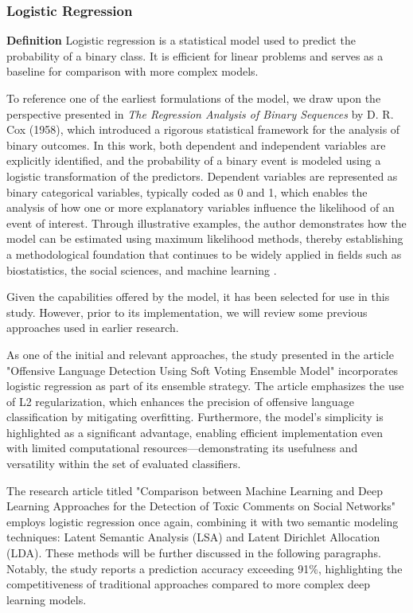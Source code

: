 \subsubsection{Logistic Regression}
\textbf{Definition}
Logistic regression is a statistical model used to predict the probability of a binary class. It is efficient for linear problems and serves as a baseline for comparison with more complex models.

To reference one of the earliest formulations of the model, we draw upon the perspective presented in \textit{The Regression Analysis of Binary Sequences} by D. R. Cox (1958), which introduced a rigorous statistical framework for the analysis of binary outcomes. In this work, both dependent and independent variables are explicitly identified, and the probability of a binary event is modeled using a logistic transformation of the predictors. Dependent variables are represented as binary categorical variables, typically coded as 0 and 1, which enables the analysis of how one or more explanatory variables influence the likelihood of an event of interest. Through illustrative examples, the author demonstrates how the model can be estimated using maximum likelihood methods, thereby establishing a methodological foundation that continues to be widely applied in fields such as biostatistics, the social sciences, and machine learning \citep{cox1958logistic}.

Given the capabilities offered by the model, it has been selected for use in this study. However, prior to its implementation, we will review some previous approaches used in earlier research.

As one of the initial and relevant approaches, the study presented in the article "Offensive Language Detection Using Soft Voting Ensemble Model" \citep{supert2023offensive} incorporates logistic regression as part of its ensemble strategy. The article emphasizes the use of L2 regularization, which enhances the precision of offensive language classification by mitigating overfitting. Furthermore, the model's simplicity is highlighted as a significant advantage, enabling efficient implementation even with limited computational resources—demonstrating its usefulness and versatility within the set of evaluated classifiers.

The research article titled "Comparison between Machine Learning and Deep Learning Approaches for the Detection of Toxic Comments on Social Networks" \citep{bonetti2023comparison} employs logistic regression once again, combining it with two semantic modeling techniques: Latent Semantic Analysis (LSA) and Latent Dirichlet Allocation (LDA). These methods will be further discussed in the following paragraphs. Notably, the study reports a prediction accuracy exceeding 91\%, highlighting the competitiveness of traditional approaches compared to more complex deep learning models.
